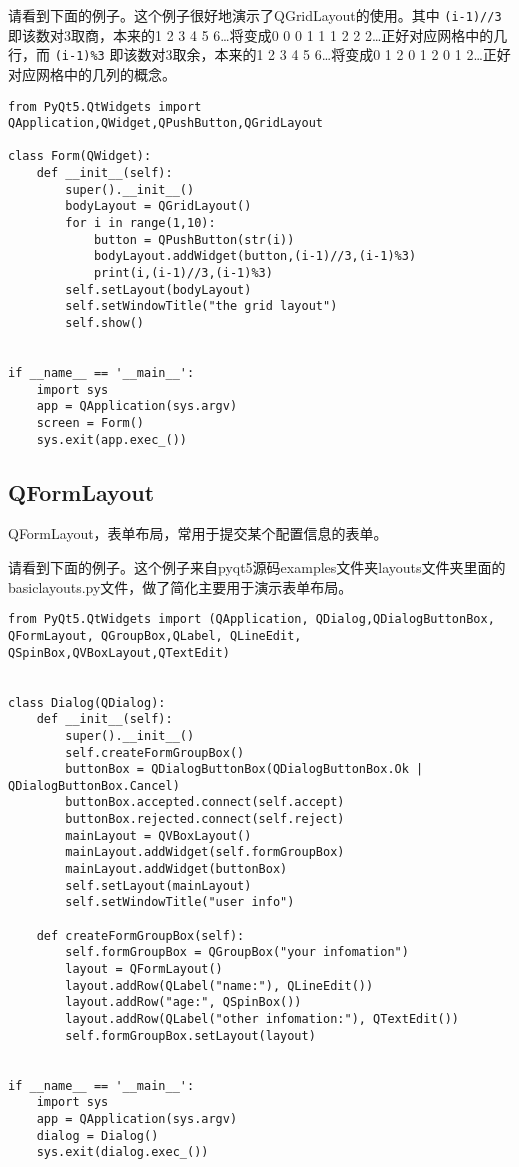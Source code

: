 \documentclass[11pt,oneside]{article}
\begin{document}
请看到下面的例子。这个例子很好地演示了QGridLayout的使用。其中 \texttt{(i-1)//3} 即该数对3取商，本来的1 2 3 4 5 6\ldots{}将变成0 0 0 1 1 1 2 2 2\ldots{}正好对应网格中的几行，而 \texttt{(i-1)\%3} 即该数对3取余，本来的1 2 3 4 5 6\ldots{}将变成0 1 2 0 1 2 0 1 2\ldots{}正好对应网格中的几列的概念。

\begin{verbatim}
from PyQt5.QtWidgets import QApplication,QWidget,QPushButton,QGridLayout

class Form(QWidget):
    def __init__(self):
        super().__init__()
        bodyLayout = QGridLayout()
        for i in range(1,10):
            button = QPushButton(str(i))
            bodyLayout.addWidget(button,(i-1)//3,(i-1)%3)
            print(i,(i-1)//3,(i-1)%3)
        self.setLayout(bodyLayout)
        self.setWindowTitle("the grid layout")
        self.show()


if __name__ == '__main__':
    import sys
    app = QApplication(sys.argv)
    screen = Form()
    sys.exit(app.exec_())
\end{verbatim}


\subsection{QFormLayout}
\label{sec:orgheadline37}
QFormLayout，表单布局，常用于提交某个配置信息的表单。

请看到下面的例子。这个例子来自pyqt5源码examples文件夹layouts文件夹里面的basiclayouts.py文件，做了简化主要用于演示表单布局。

\begin{verbatim}
from PyQt5.QtWidgets import (QApplication, QDialog,QDialogButtonBox, QFormLayout, QGroupBox,QLabel, QLineEdit, QSpinBox,QVBoxLayout,QTextEdit)


class Dialog(QDialog):
    def __init__(self):
        super().__init__()
        self.createFormGroupBox()
        buttonBox = QDialogButtonBox(QDialogButtonBox.Ok | QDialogButtonBox.Cancel)
        buttonBox.accepted.connect(self.accept)
        buttonBox.rejected.connect(self.reject)
        mainLayout = QVBoxLayout()
        mainLayout.addWidget(self.formGroupBox)
        mainLayout.addWidget(buttonBox)
        self.setLayout(mainLayout)
        self.setWindowTitle("user info")

    def createFormGroupBox(self):
        self.formGroupBox = QGroupBox("your infomation")
        layout = QFormLayout()
        layout.addRow(QLabel("name:"), QLineEdit())
        layout.addRow("age:", QSpinBox())
        layout.addRow(QLabel("other infomation:"), QTextEdit())
        self.formGroupBox.setLayout(layout)


if __name__ == '__main__':
    import sys
    app = QApplication(sys.argv)
    dialog = Dialog()
    sys.exit(dialog.exec_())
\end{verbatim}
\end{document}
